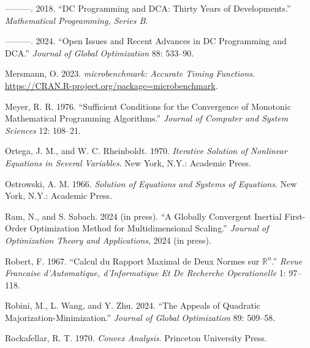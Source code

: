 \documentclass[
  12pt,
]{article}
\newlength{\cslhangindent}
\newenvironment{CSLReferences}[2] %
 {\begin{list}{}{%
  \setlength{\itemindent}{0pt}
  \setlength{\leftmargin}{0pt}
  \setlength{\parsep}{0pt}
  \ifodd #1
   \setlength{\leftmargin}{\cslhangindent}
   \setlength{\itemindent}{-1\cslhangindent}
  \fi
  \setlength{\itemsep}{#2\baselineskip}}}
 {\end{list}}
\begin{document}
\begin{CSLReferences}{1}{0}
---------. 2018. {``{DC Programming and DCA: Thirty Years of Developments}.''} \emph{Mathematical Programming, Series B}.

---------. 2024. {``Open Issues and Recent Advances in DC Programming and DCA.''} \emph{Journal of Global Optimization} 88: 533--90.

Mersmann, O. 2023. \emph{{microbenchmark: Accurate Timing Functions}}. \url{https://CRAN.R-project.org/package=microbenchmark}.

Meyer, R. R. 1976. {``{Sufficient Conditions for the Convergence of Monotonic Mathematical Programming Algorithms}.''} \emph{Journal of Computer and System Sciences} 12: 108--21.

Ortega, J. M., and W. C. Rheinboldt. 1970. \emph{{Iterative Solution of Nonlinear Equations in Several Variables}}. New York, N.Y.: Academic Press.

Ostrowski, A. M. 1966. \emph{{Solution of Equations and Systems of Equations}}. New York, N.Y.: Academic Press.

Ram, N., and S. Sabach. 2024 (in press). {``A Globally Convergent Inertial First-Order Optimization Method for Multidimensional Scaling.''} \emph{Journal of Optimization Theory and Applications}, 2024 (in press).

Robert, F. 1967. {``{Calcul du Rapport Maximal de Deux Normes sur \(\mathbb{R}^n\)}.''} \emph{Revue Francaise d'Automatique, d'Informatique Et De Recherche Operationelle} 1: 97--118.

Robini, M., L. Wang, and Y. Zhu. 2024. {``The Appeals of Quadratic Majorization-Minimization.''} \emph{Journal of Global Optimization} 89: 509--58.

Rockafellar, R. T. 1970. \emph{Convex Analysis}. Princeton University Press.

\end{CSLReferences}
\end{document}
